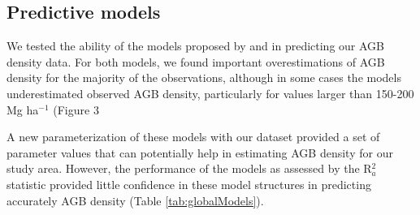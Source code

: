 \documentclass[review, authoryear]{elsarticle}   	%
\begin{document}


\subsection{Predictive models}

We tested the ability of the models proposed by \citet{Twilley1992} and \citet{CONL:CONL12060}  in predicting our AGB density data. For both models, we found important overestimations of AGB density for the majority of the observations, although in some cases the models underestimated observed AGB density, particularly for values larger than 150-200 Mg ha$^{-1}$  (Figure 3 %



A  new parameterization of these models with our dataset provided a set of parameter values that can potentially help in estimating AGB density for our study area. However, the performance of the models as assessed by the R$_a^2$ statistic provided little confidence in these model structures in predicting accurately AGB density (Table \ref{tab:globalModels}).
\end{document}
